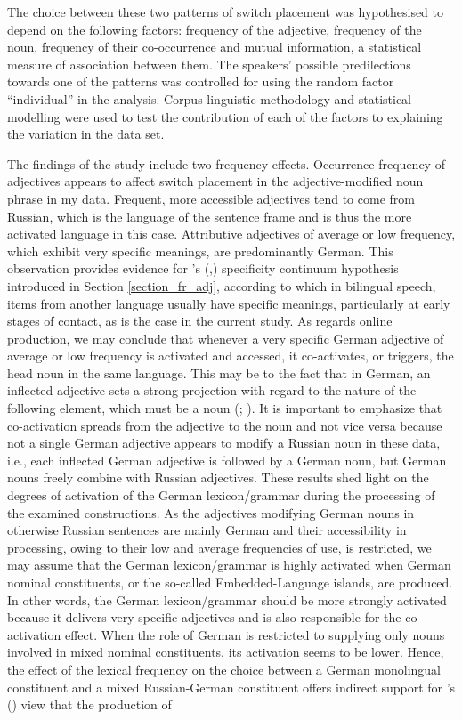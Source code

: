 The choice between these two patterns of switch placement was hypothesised to depend on the following factors: frequency of the adjective, frequency of the noun, frequency of their co-occurrence and mutual information, a statistical measure of association between them. The speakers' possible predilections towards one of the patterns was controlled for using the random factor “individual” in the analysis. Corpus linguistic methodology and statistical modelling were used to test the contribution of each of the factors to explaining the variation in the data set.

The findings of the study include two frequency effects. Occurrence frequency of adjectives appears to affect switch placement in the adjective-modified noun phrase in my data. Frequent, more accessible adjectives tend to come from Russian, which is the language of the sentence frame and is thus the more activated language in this case. Attributive adjectives of average or low frequency, which exhibit very specific meanings, are predominantly German. This observation provides evidence for \citeauthor{backus-evidence-1999}’s (\citeyear{backus-evidence-1999},\citeyear{backus-units-2003}) specificity continuum hypothesis introduced in Section \ref{section_fr_adj}, according to which in bilingual speech, items from another language usually have specific meanings, particularly at early stages of contact, as is the case in the current study. As regards online production, we may conclude that whenever a very specific German adjective of average or low frequency is activated and accessed, it co-activates, or triggers, the head noun in the same language. This may be to the fact that in German, an inflected adjective sets a strong projection with regard to the nature of the following element, which must be a noun (\citealt[][98]{auer_syntax_2007}; \citealt[cf.][]{auer_projection_2005}). It is important to emphasize that co-activation spreads from the adjective to the noun and not vice versa because not a single German adjective appears to modify a Russian noun in these data, i.e., each inflected German adjective is followed by a German noun, but German nouns freely combine with Russian adjectives. These results shed light on the degrees of activation of the German lexicon/grammar during the processing of the examined constructions. As the adjectives modifying German nouns in otherwise Russian sentences are mainly German and their accessibility in processing, owing to their low and average frequencies of use, is restricted, we may assume that the German lexicon/grammar is highly activated when German nominal constituents, or the so-called Embedded-Language islands, are produced. In other words, the German lexicon/grammar should be more strongly activated because it delivers very specific adjectives and is also responsible for the co-activation effect. When the role of German is restricted to supplying only nouns involved in mixed nominal constituents, its activation seems to be lower. Hence, the effect of the lexical frequency on the choice between a German monolingual constituent and a mixed Russian-German constituent offers indirect support for \citeauthor{myers-scotton-contact-2002}’s (\citeyear[][140]{myers-scotton-contact-2002}) view that the production of 